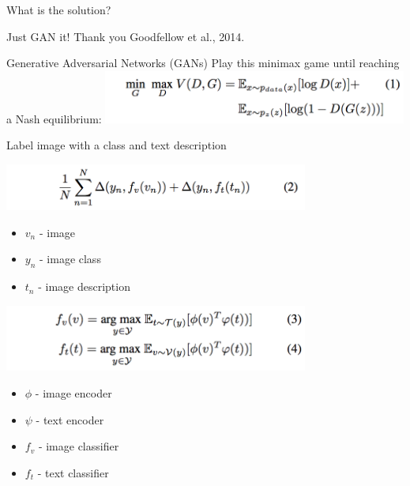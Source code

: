 \documentclass{beamer}
\begin{document}
\begin{frame}{What is the solution?}
\begin{block}{Just GAN it!}
Thank you Goodfellow et al., 2014.
\end{block}
\end{frame}


\begin{frame}{Generative Adversarial Networks (GANs)}
Play this minimax game until reaching a Nash equilibrium:
\vskip0.5cm
\centering
\includegraphics[width=10cm]{img/reed/gan_eq.png}
\end{frame}


\begin{frame}{Label image with a class and text description}

\begin{center}
\includegraphics[width=10cm]{img/reed/joint.png}
\end{center}

\begin{itemize}
\item $v_n$ - image
\item $y_n$ - image class
\item $t_n$ - image description
\end{itemize}

\begin{center}
\includegraphics[width=10cm]{img/reed/classifiers.png}
\end{center}

\begin{itemize}
\item $\phi$ - image encoder
\item $\psi$ - text encoder
\item $f_v$ - image classifier
\item $f_t$ - text classifier

\end{itemize}
\end{frame}
\end{document}

